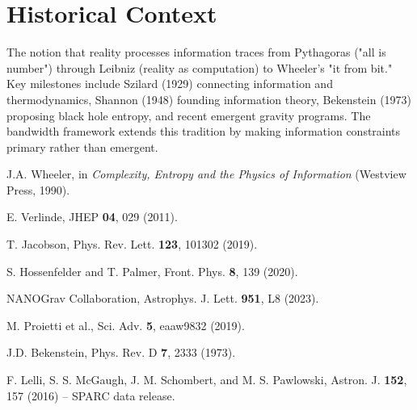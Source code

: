 \documentclass[twocolumn,prd,amsmath,amssymb,aps,superscriptaddress,nofootinbib]{revtex4-2}
\begin{document}
\appendix

\section{Historical Context}

The notion that reality processes information traces from Pythagoras ("all is number") through Leibniz (reality as computation) to Wheeler's "it from bit." Key milestones include Szilard (1929) connecting information and thermodynamics, Shannon (1948) founding information theory, Bekenstein (1973) proposing black hole entropy, and recent emergent gravity programs. The bandwidth framework extends this tradition by making information constraints primary rather than emergent.

\begin{thebibliography}{99}

 J.A. Wheeler, in \textit{Complexity, Entropy and the Physics of Information} (Westview Press, 1990).

 E. Verlinde, JHEP \textbf{04}, 029 (2011).

 T. Jacobson, Phys. Rev. Lett. \textbf{123}, 101302 (2019).

 S. Hossenfelder and T. Palmer, Front. Phys. \textbf{8}, 139 (2020).

 NANOGrav Collaboration, Astrophys. J. Lett. \textbf{951}, L8 (2023).

 M. Proietti et al., Sci. Adv. \textbf{5}, eaaw9832 (2019).

 J.D. Bekenstein, Phys. Rev. D \textbf{7}, 2333 (1973).

 F. Lelli, S. S. McGaugh, J. M. Schombert, and M. S. Pawlowski, Astron. J. \textbf{152}, 157 (2016) – SPARC data release.

\end{thebibliography}

\end{document}

